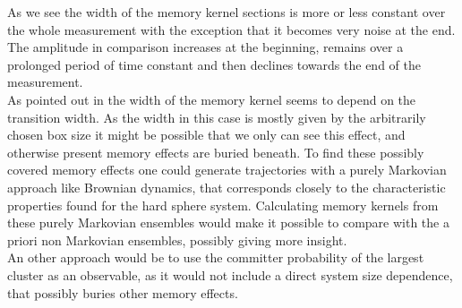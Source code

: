 As we see the width of the memory kernel sections is more or less constant over the whole measurement with the exception that it becomes very noise at the end.\\
The amplitude in comparison increases at the beginning, remains over a prolonged period of time constant and then declines towards the end of the measurement.\\
As pointed out in  the width of the memory kernel seems to depend on the transition width. As the width in this case is mostly given by the arbitrarily chosen box size it might be possible that we only can see this effect, and otherwise present memory effects are buried beneath. To find these possibly covered memory effects one could generate trajectories with a purely Markovian approach like Brownian dynamics, that corresponds closely to the characteristic properties found for the hard sphere system. Calculating memory kernels from these purely Markovian ensembles would make it possible to compare with the a priori non Markovian ensembles, possibly giving more insight.\\
An other approach would be to use the committer probability of the largest cluster as an observable, as it would not include a direct system size dependence, that possibly buries other memory effects.
